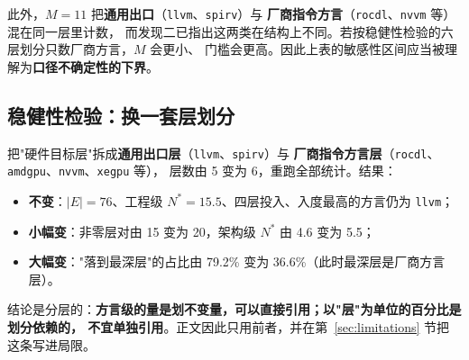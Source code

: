 此外，$M=11$ 把\textbf{通用出口}（\texttt{llvm}、\texttt{spirv}）与
\textbf{厂商指令方言}（\texttt{rocdl}、\texttt{nvvm} 等）混在同一层里计数，
而发现二已指出这两类在结构上不同。若按稳健性检验的六层划分只数厂商方言，$M$ 会更小、
门槛会更高。因此上表的敏感性区间应当被理解为\textbf{口径不确定性的下界}。

\subsection{稳健性检验：换一套层划分}
\label{sec:robust}

把"硬件目标层"拆成\textbf{通用出口层}（\texttt{llvm}、\texttt{spirv}）与
\textbf{厂商指令方言层}（\texttt{rocdl}、\texttt{amdgpu}、\texttt{nvvm}、\texttt{xegpu} 等），
层数由 5 变为 6，重跑全部统计。结果：

\begin{itemize}
  \item \textbf{不变}：$|E|=76$、工程级 $N^{*}=15.5$、四层投入、入度最高的方言仍为 \texttt{llvm}；
  \item \textbf{小幅变}：非零层对由 15 变为 20，架构级 $N^{*}$ 由 4.6 变为 5.5；
  \item \textbf{大幅变}："落到最深层"的占比由 79.2\% 变为 36.6\%（此时最深层是厂商方言层）。
\end{itemize}

结论是分层的：\textbf{方言级的量是划不变量，可以直接引用；以"层"为单位的百分比是划分依赖的，
不宜单独引用}。正文因此只用前者，并在第~\ref{sec:limitations} 节把这条写进局限。
